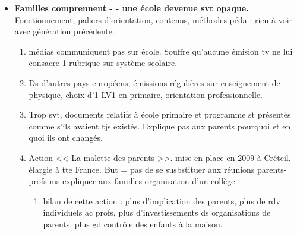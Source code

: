 \documentclass[12pt]{report}
\begin{document}
\begin{itemize}
\item \textbf{Familles comprennent - - une école devenue svt opaque.} Fonctionnement, paliers d'orientation, contenus, méthodes péda : rien à voir avec génération précédente.\\
\begin{enumerate}
\item médias communiquent pas sur école. Souffre qu'aucune émision tv ne lui consacre 1 rubrique sur système scolaire.\\
\item Ds d'autres pays européens, émissions régulières sur enseignement de physique, choix d'1 LV1 en primaire, orientation professionnelle.\\
\item Trop svt, documents relatifs à école primaire et programme st présentés comme s'ils avaient tjs existés. Explique pas aux parents pourquoi et en quoi ils ont changés.\\
\item Action << La malette des parents >>. mise en place en 2009 à Créteil. élargie à tte France. But = pas de se susbstituer aux réunions parents-profs ms expliquer aux familles organisation d'un collège.\\
\begin{enumerate}
\item bilan de cette action : plus d'implication des parents, plus de rdv individuels ac profs, plus d'investissements ds organisations de parents, plus gd contrôle des enfants à la maison.\\
\end{enumerate}
\end{enumerate}


\end{itemize}
\end{document}
